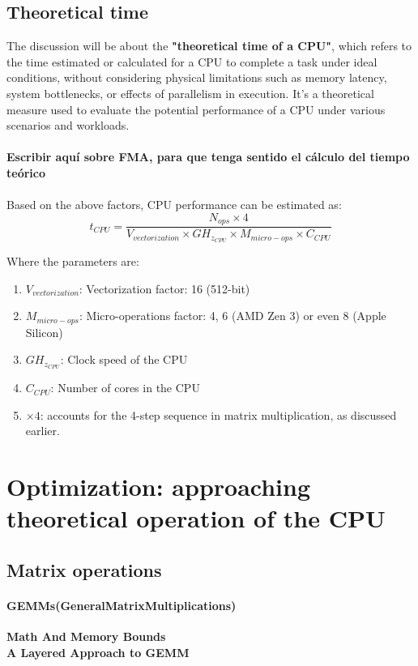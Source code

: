 \documentclass{article}
\begin{document}
    \subsection{Theoretical time}
    The discussion will be about the \textbf{"theoretical time of a CPU"}, which refers to the time estimated or calculated for a CPU to complete a task under ideal conditions, without considering physical limitations such as memory latency, system bottlenecks, or effects of parallelism in execution. It's a theoretical measure used to evaluate the potential performance of a CPU under various scenarios and workloads.
    \\ \\
    \textbf{Escribir aquí sobre FMA, para que tenga sentido el cálculo del tiempo teórico}
    \\ \\
    Based on the above factors, CPU performance can be estimated as:
        \[
            t_{CPU}=\frac{N_{ops} \times 4}{V_{vectorization} \times GH_{z_{CPU}} \times M_{micro-ops} \times C_{CPU}}
        \] 

    Where the parameters are: 
    \begin{enumerate}
        \item \(V_{vectorization}\): Vectorization factor: 16 (512-bit)
        \item \(M_{micro-ops}\): Micro-operations factor: 4, 6 (AMD Zen 3) or even 8 (Apple Silicon)
        \item \(GH_{z_{CPU}}\): Clock speed of the CPU
        \item \(C_{CPU}\): Number of cores in the CPU
        \item \(\times 4\):  accounts for the 4-step sequence in matrix multiplication, as discussed earlier.
    \end{enumerate}

    
\newpage
\section{Optimization: approaching theoretical operation of the CPU}

    \subsection{Matrix operations}

    \paragraph{GEMMs(GeneralMatrixMultiplications)}
    \textbf{Math And Memory Bounds}         \\
    \textbf{A Layered Approach to GEMM}
\end{document}
